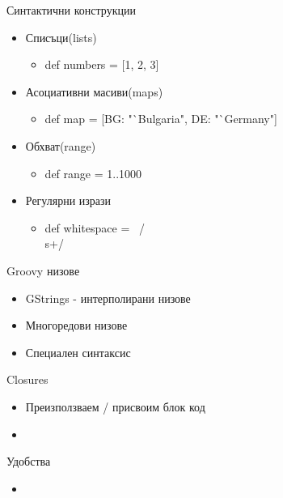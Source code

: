 \documentclass[compress,red]{beamer}
\begin{document}
\begin{frame}{Синтактични конструкции}
  \transdissolve
  \begin{itemize}
  \item Списъци(lists)
    \begin{itemize}
    \item def numbers = [1, 2, 3]      
    \end{itemize}
  \item Асоциативни масиви(maps)
    \begin{itemize}
    \item def map = [BG: "`Bulgaria", DE: "`Germany"]      
    \end{itemize}
  \item Обхват(range)
    \begin{itemize}
      \item def range = 1..1000
    \end{itemize}
  \item Регулярни изрази
    \begin{itemize}
      \item def whitespace = ~/\\s+/
    \end{itemize}

  \end{itemize}
\end{frame}

\begin{frame}{Groovy низове}
  \transdissolve
  \begin{itemize}
  \item GStrings - интерполирани низове
  \item Многоредови низове
  \item Специален синтаксис
  \end{itemize}
\end{frame}

\begin{frame}{Closures}
  \transdissolve
  \begin{itemize}
  \item Преизползваем / присвоим блок код
  \item 
  \end{itemize}
\end{frame}

\begin{frame}{Удобства}
  \transdissolve
  \begin{itemize}
  \item 
  \end{itemize}
\end{frame}
\end{document}
